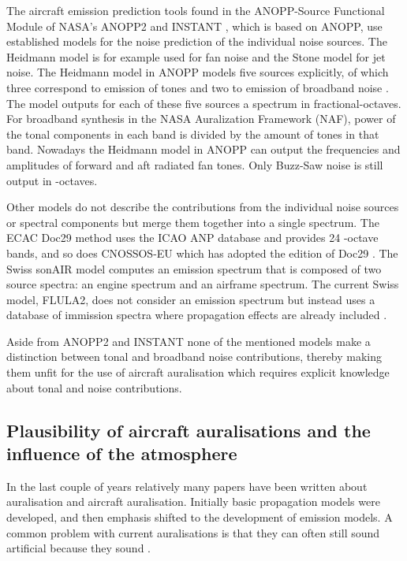 The aircraft emission prediction tools found in the ANOPP-Source Functional
Module of NASA's ANOPP2 \cite{Lopes2016, Tuttle2017} and INSTANT \cite{Sahai2016b}, which is based
on ANOPP, use established models for the noise prediction of the individual
noise sources. The Heidmann model is for example used for fan noise and the
Stone model for jet noise. The Heidmann model in ANOPP models
five sources explicitly, of which three correspond to emission of tones and two
to emission of broadband noise \cite{Arntzen2014a}. The model outputs for each
of these five sources a spectrum in fractional-octaves.
For broadband synthesis in the NASA Auralization Framework (NAF)\cite{Aumann2015}, power of the tonal
components in each band is divided by the amount of tones in that band.
Nowadays the Heidmann model in ANOPP can output the frequencies and amplitudes
of forward and aft radiated fan tones. Only Buzz-Saw noise is still output in
-octaves.


Other models do not describe the contributions from the individual noise
sources or spectral components but merge them together into a single spectrum.
The ECAC Doc29 method \cite{Doc29_fourth_2016} uses the ICAO ANP database and
provides 24 -octave bands, and so does CNOSSOS-EU which has
adopted the  edition of Doc29 \cite{Doc29_third_2005}. The Swiss sonAIR
model \cite{Zellmann2016} computes an emission spectrum that is composed of two
source spectra: an engine spectrum and an airframe spectrum. The current Swiss
model, FLULA2, does not consider an emission spectrum but instead uses a database
of immission spectra where propagation effects are already included
\cite{EMPA2010,Schaffer2014}.

Aside from ANOPP2 and INSTANT none of the mentioned models make a distinction
between tonal and broadband noise contributions, thereby making them unfit for the use of
aircraft auralisation which requires explicit knowledge about tonal and noise
contributions.

\subsection{Plausibility of aircraft auralisations and the influence of the atmosphere}
In the last couple of years relatively many papers have been written about
auralisation and aircraft auralisation. Initially basic propagation models were
developed, and then emphasis shifted to the development of emission models. A
common problem with current auralisations is that they can often still sound
artificial because they sound .

